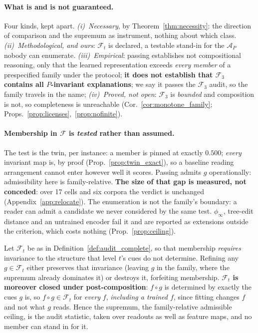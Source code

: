 \paragraph{What is and is not guaranteed.} Four kinds, kept apart. \emph{(i)~Necessary}, by Theorem~\ref{thm:necessity}: the direction of comparison and the supremum as instrument, nothing about which class. \emph{(ii)~Methodological, and ours}: $\mathcal{F}_t$ is declared, a testable stand-in for the $\mathcal{A}_P$ nobody can enumerate. \emph{(iii)~Empirical}: passing establishes not compositional reasoning, only that the learned representation exceeds \emph{every member} of a prespecified family under the protocol; \textbf{it does not establish that $\mathcal{F}_3$ contains all $P$-invariant explanations}; we say it passes the $\mathcal{F}_3$ audit, so the family travels in the name; \emph{(iv)~Proved, not open}: $\mathcal{F}_3$ is \emph{bounded} and composition is not, so completeness is unreachable (Cor.~\ref{cor:monotone_family}; Props.~\ref{prop:licenses},~\ref{prop:nofinite}).

\paragraph{Membership in $\mathcal{F}$ is \emph{tested} rather than assumed.} The test is the twin, per instance: a member is pinned at exactly $0.500$; \emph{every} invariant map is, by proof (Prop.~\ref{prop:twin_exact}), so a baseline reading arrangement cannot enter however well it scores. Passing admits $g$ operationally: admissibility here is family-relative. \textbf{The size of that gap is measured, not conceded}: over 17 cells and six corpora the verdict is unchanged (Appendix~\ref{app:relocate}). The enumeration is not the family's boundary: a reader can admit a candidate we never considered by the same test. $\phi_\infty$, tree-edit distance and an untrained encoder fail it and are reported as extensions outside the criterion, which costs nothing (Prop.~\ref{prop:ceiling}).

\begin{proposition}
\label{prop:ceiling}
Let $\mathcal{F}_t$ be as in Definition~\ref{def:audit_complete}, so that membership \emph{requires} invariance to the structure that level $t$'s cues do not determine. Refining any $g\in\mathcal{F}_t$ either preserves that invariance (leaving $g$ in the family, where the supremum already dominates it) or destroys it, forfeiting membership. \textbf{$\mathcal{F}_t$ is moreover closed under post-composition}: $f\circ g$ is determined by exactly the cues $g$ is, so $f\circ g\in\mathcal{F}_t$ for \emph{every} $f$, \emph{including a trained $f$}, since fitting changes $f$ and not what $g$ reads. Hence the supremum, the family-relative admissible ceiling, is the audit statistic, taken over readouts as well as feature maps, and no member can stand in for it.
\end{proposition}

